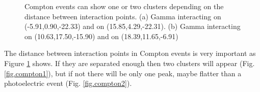\begin{figure}[!htb]
	\centering
	\caption{\label{fig.compton} Compton events can show one or two clusters depending on the distance between interaction points. (a) Gamma interacting on (-5.91,0.90,-22.33) and on (15.85,4.29,-22.31). (b) Gamma interacting on (10.63,17.50,-15.90) and on (18.39,11.65,-6.91)
	}
\end{figure}

\newpage
The distance between interaction points in Compton events is very important as Figure \ref{fig.compton} shows. If they are separated enough then two clusters will appear (Fig. \ref{fig.compton1}), but if not there will be only one peak, maybe flatter than a photoelectric event (Fig. \ref{fig.compton2}). 

